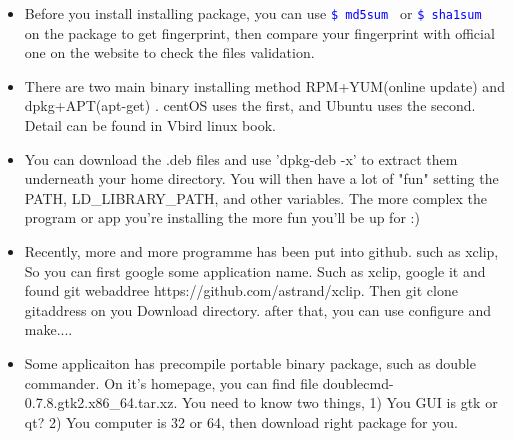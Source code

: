 \documentclass[a4paper,12pt,twoside]{book}
\newcommand{\linuxcommand}[1]{\texttt{\textcolor{blue}{\$ #1 \Pisymbol{psy}{191}}}}
\begin{document}
\begin{itemize}
	\item Before you install installing package, you can use \linuxcommand{md5sum} or \linuxcommand{sha1sum} on the package to get fingerprint, then compare your fingerprint with official one on the website to check the files validation.


    \item There are two main binary installing method RPM+YUM(online update) and dpkg+APT(apt-get) . centOS uses the first, and Ubuntu uses the second. Detail can be found in Vbird linux book.

	\item  You can download the .deb files and use 'dpkg-deb -x' to extract them underneath your home directory. You will then have a lot of "fun" setting the PATH, LD_LIBRARY_PATH, and other variables. The more complex the program or app you're installing the more fun you'll be up for :)
	\item Recently, more and more programme has been put into github. such as xclip, So you can first google some application name. Such as xclip, google it and found git webaddree https://github.com/astrand/xclip. Then git clone gitaddress on you Download directory. after that, you can use configure and make....

	\item Some applicaiton has precompile portable binary package, such as double commander. On it's homepage, you can find file  doublecmd-0.7.8.gtk2.x86_64.tar.xz. You need to know two things, 1) You GUI is gtk or qt? 2) You computer is 32 or 64, then download right package for you.
	\end{itemize}
\end{document}
